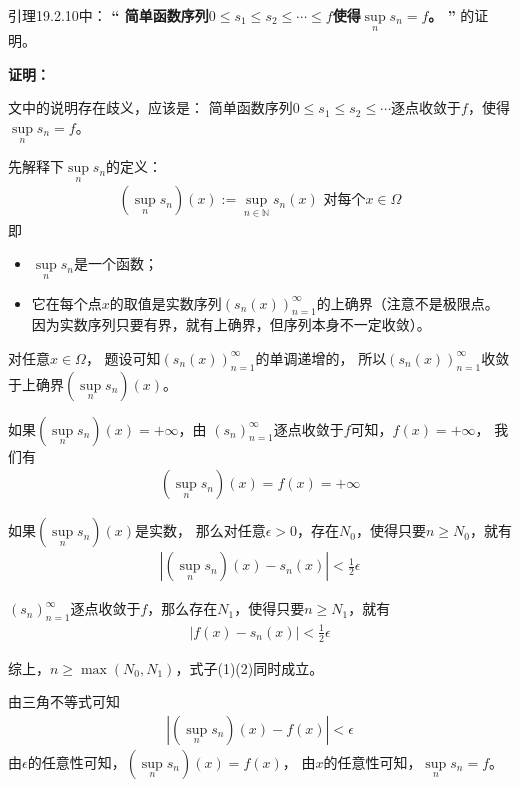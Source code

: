 \documentclass{article}
\begin{document}
\begin{zremark}
  引理19.2.10中：
  \textbf{“
    简单函数序列$0 \leq s_1 \leq s_2 \leq \cdots \leq f$使得$\sup\limits_{n} s_n = f$。
    ”}
  的证明。
\end{zremark}

\textbf{证明：}

文中的说明存在歧义，应该是：
简单函数序列$0 \leq s_1 \leq s_2 \leq \cdots $逐点收敛于$f$，使得$\sup\limits_{n} s_n = f$。

先解释下$\sup\limits_{n} s_n$的定义：
\begin{align*}
  (\sup\limits_{n} s_n)(x) := \sup\limits_{n \in \mathbb{N}} s_n(x) \,\, \text{对每个$x \in \Omega$}
\end{align*}
即
\begin{itemize}
  \item $\sup\limits_{n} s_n$是一个函数；
  \item 它在每个点$x$的取值是实数序列$(s_n(x))_{n = 1}^\infty$的上确界（注意不是极限点。
        因为实数序列只要有界，就有上确界，但序列本身不一定收敛）。
\end{itemize}

对任意$x \in \Omega$，
题设可知$(s_n(x))_{n = 1}^\infty$的单调递增的，
所以$(s_n(x))_{n = 1}^\infty$收敛于上确界$(\sup\limits_{n} s_n)(x)$。

如果$(\sup\limits_{n} s_n)(x) = +\infty$，由
$(s_n)_{n = 1}^\infty$逐点收敛于$f$可知，$f(x) = +\infty$，
我们有
\begin{align*}
  (\sup\limits_{n} s_n)(x) = f(x) = +\infty
\end{align*}

如果$(\sup\limits_{n} s_n)(x)$是实数，
那么对任意$\epsilon > 0$，存在$N_0$，使得只要$n \geq N_0$，就有
\begin{align}
  |(\sup\limits_{n} s_n)(x) - s_n(x)| < \frac{1}{2}\epsilon
\end{align}

$(s_n)_{n = 1}^\infty$逐点收敛于$f$，那么存在$N_1$，使得只要$n \geq N_1$，就有
\begin{align}
  |f(x) - s_n(x)| < \frac{1}{2}\epsilon
\end{align}

综上，$n \geq \max(N_0, N_1)$，式子(1)(2)同时成立。

由三角不等式可知
\begin{align*}
  |(\sup\limits_{n} s_n)(x) - f(x)| < \epsilon
\end{align*}
由$\epsilon$的任意性可知，$(\sup\limits_{n} s_n)(x) = f(x)$，
由$x$的任意性可知，$\sup\limits_{n} s_n = f$。
\end{document}
